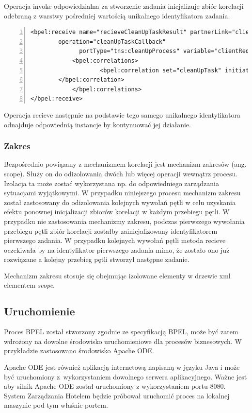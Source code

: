 Operacja invoke odpowiedzialna za stworzenie zadania inicjalizuje zbiór korelacji odebraną z warstwy pośredniej wartością unikalnego identyfikatora zadania.

\begin{lstlisting}[caption=Wykorzystanie zbiorów korelacji w aktywności receive.,numbers=left]
<bpel:receive name="recieveCleanUpTaskResult" partnerLink="client" 
		operation="cleanUpTaskCallback"
	          portType="tns:cleanUpProcess" variable="clientRequest">
            <bpel:correlations>
                	<bpel:correlation set="cleanUpTask" initiate="no">
		</bpel:correlation>    
            </bpel:correlations>
</bpel:receive>

\end{lstlisting}

 Operacja recieve następnie na podstawie tego samego unikalnego identyfikatora odnajduje odpowiednią instancje by kontynuować jej działanie. 

\subsubsection{Zakres }
Bezpośrednio powiązany z mechanizmem korelacji jest mechanizm zakresów (ang. scope). Służy on do odizolowania dwóch lub więcej operacji wewnątrz procesu. Izolacja ta może zostać wykorzystana np. do odpowiedniego zarządzania sytuacjami wyjątkowymi. W przypadku niniejszego procesu mechanizm zakresu został zastosowany do odizolowania kolejnych wywołań pętli w celu uzyskania efektu ponownej inicjalizacji zbiorów korelacji w każdym przebiegu pętli. W przypadku nie zastosowania mechanizmy zakresu, podczas pierwszego wywołania przebiegu pętli zbiór korelacji zostałby zainicjalizowany identyfikatorem pierwszego zadania. W przypadku kolejnych wywołań pętli metoda recieve oczekiwała by na identyfikator pierwszego zadania mimo, że zostało ono już rozwiązane a kolejny przebieg pętli stworzył następne zadanie. 

Mechanizm zakresu stosuje się obejmując izolowane elementy w drzewie xml elementem \textit{scope}.

\subsection{Uruchomienie}
 Proces BPEL został stworzony zgodnie ze specyfikacją BPEL, może być zatem wdrożony na dowolne środowisko uruchomieniowe dla procesów biznesowych. W przykładzie zastosowano środowisko Apache ODE. 

Apache ODE jest również aplikacją internetową napisaną w języku Java i może być uruchomiony z~wykorzystaniem dowolnego serwera aplikacyjnego. Ważne jest aby silnik Apache ODE został uruchomiony z wykorzystaniem portu 8080. System Zarządzania Hotelem będzie próbował uruchomić proces na lokalnej maszynie pod tym właśnie portem.  


